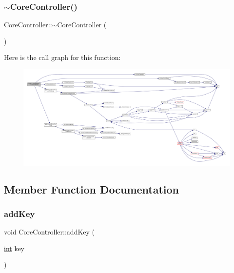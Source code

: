 \subsubsection{\texorpdfstring{$\sim$\+Core\+Controller()}{~CoreController()}}
{\footnotesize\ttfamily Core\+Controller\+::$\sim$\+Core\+Controller (\begin{DoxyParamCaption}{ }\end{DoxyParamCaption})}

Here is the call graph for this function\+:
\nopagebreak
\begin{figure}[H]
\begin{center}
\leavevmode
\includegraphics[width=350pt]{class_q_g_b_a_1_1_core_controller_a334c26059c56bff3eb22059450e9c7a9_cgraph}
\end{center}
\end{figure}


\subsection{Member Function Documentation}
\mbox{\label{class_q_g_b_a_1_1_core_controller_a9dc0efe3d090dc954ce54436006bbd7d}} 
\subsubsection{\texorpdfstring{add\+Key}{addKey}}
{\footnotesize\ttfamily void Core\+Controller\+::add\+Key (\begin{DoxyParamCaption}\item[{\mbox{\hyperlink{ioapi_8h_a787fa3cf048117ba7123753c1e74fcd6}{int}}}]{key }\end{DoxyParamCaption})\hspace{0.3cm}{\ttfamily [slot]}}

